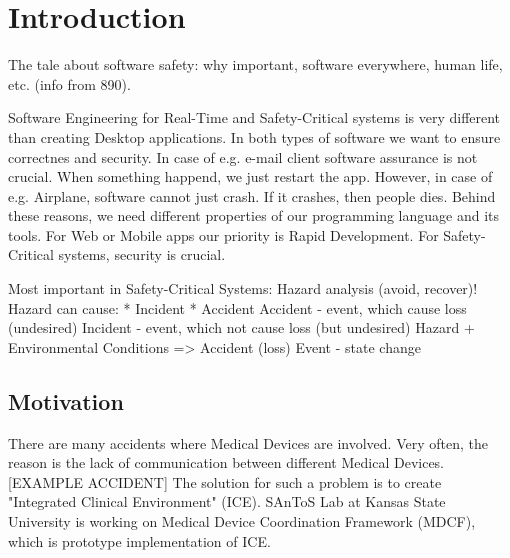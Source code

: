 
\cleardoublepage


\chapter{Introduction}
\label{introduction}

The tale about software safety: why important, software everywhere, human life, etc. (info from 890).

Software Engineering for Real-Time and Safety-Critical systems is very different than creating Desktop applications. In both types of software we want to ensure correctnes and security. In case of e.g. e-mail client software assurance is not crucial. When something happend, we just restart the app. However, in case of e.g. Airplane, software cannot just crash. If it crashes, then people dies. Behind these reasons, we need different properties of our programming language and its tools. For Web or Mobile apps our priority is Rapid Development. For Safety-Critical systems, security is crucial.


Most important in Safety-Critical Systems: Hazard analysis (avoid, recover)!
Hazard can cause:
	* Incident
	* Accident
Accident - event, which cause loss (undesired)
Incident - event, which not cause loss (but undesired)
Hazard + Environmental Conditions => Accident (loss)
Event - state change


\section{Motivation}
\label{introduction:motivation}
There are many accidents where Medical Devices are involved. Very often, the reason is the lack of communication between different Medical Devices. [EXAMPLE ACCIDENT]
The solution for such a problem is to create "Integrated Clinical Environment" (ICE). SAnToS Lab at Kansas State University is working on Medical Device Coordination Framework (MDCF), which is prototype implementation of ICE.  

